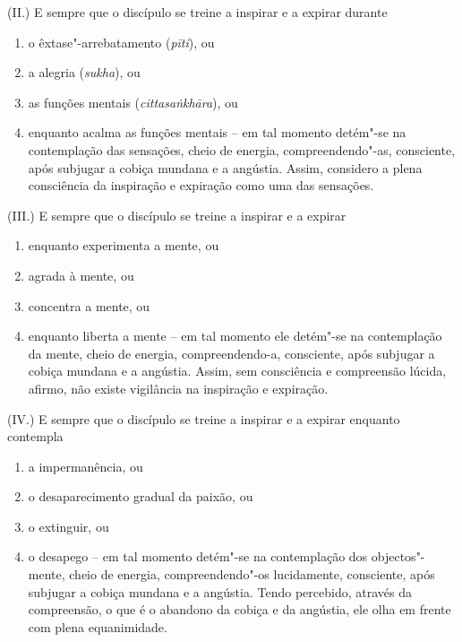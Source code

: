 (II.) E sempre que o discípulo se treine a inspirar e a expirar durante

\begin{enumerate}
  \item o êxtase"-arrebatamento (\emph{pīti}), ou

  \item a alegria (\emph{sukha}), ou

  \item as funções mentais (\emph{cittasaṅkhāra}), ou

  \item enquanto acalma as funções mentais -- em tal momento detém"-se na
        contemplação das sensações, cheio de energia, compreendendo"-as,
        consciente, após subjugar a cobiça mundana e a angústia. Assim,
        considero a plena consciência da inspiração e expiração como uma das
        sensações.
\end{enumerate}

(III.) E sempre que o discípulo se treine a inspirar e a expirar

\begin{enumerate}
  \item enquanto experimenta a mente, ou

  \item agrada à mente, ou

  \item concentra a mente, ou

  \item enquanto liberta a mente -- em tal momento ele detém"-se na contemplação da mente,
        cheio de energia, compreendendo-a, consciente, após subjugar a
        cobiça mundana e a angústia. Assim, sem consciência e compreensão lúcida, afirmo,
        não existe vigilância na inspiração e expiração.
\end{enumerate}

(IV.) E sempre que o discípulo se treine a inspirar e a expirar enquanto contempla

\begin{enumerate}
  \item a impermanência, ou

  \item o desaparecimento gradual da paixão, ou

  \item o extinguir, ou

  \item o desapego -- em tal momento detém"-se na contemplação dos
        objectos"-mente, cheio de energia, compreendendo"-os lucidamente, consciente, após
        subjugar a cobiça mundana e a angústia. Tendo percebido, através da compreensão,
        o que é o abandono da cobiça e da angústia, ele olha em frente com plena
        equanimidade.
\end{enumerate}


